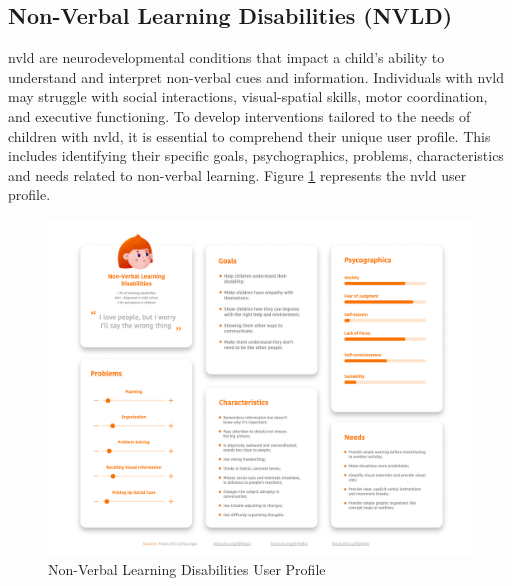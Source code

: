 \subsection{Non-Verbal Learning Disabilities (NVLD)}
\gls{nvld} are neurodevelopmental conditions that impact a child's ability to understand and interpret non-verbal cues and information. Individuals with \gls{nvld} may struggle with social interactions, visual-spatial skills, motor coordination, and executive functioning. To develop interventions tailored to the needs of children with \gls{nvld}, it is essential to comprehend their unique user profile. This includes identifying their specific goals, psychographics, problems, characteristics and needs related to non-verbal learning. Figure \ref{fig:nvldUserProfile} represents the \gls{nvld} user profile.

\begin{figure}[H]
    \centering
    \includegraphics[width=1\linewidth]{Chapters/figma/Non-Verbal Learning Disabilities.png}
    \caption{Non-Verbal Learning Disabilities User Profile}
    \label{fig:nvldUserProfile}
\end{figure}

